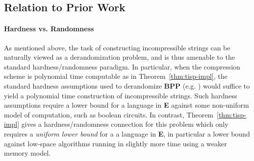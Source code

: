 \documentclass[11pt]{article}
\def\cl{\bf}
\begin{document}
\subsection{Relation to Prior Work}\label{subsec:prior}
\paragraph{Hardness vs. Randomness}
As mentioned above, the task of constructing incompressible strings can be naturally viewed as a derandomization problem, and is thus amenable to the standard hardness/randomness paradigm. In particular, when the compression scheme is polynomial time computable as in Theorem~\ref{thm:tisp-impl}, the standard hardness assumptions used to derandomize {\cl BPP} (e.g. \cite{IW}) would suffice to yield a polynomial time construction of incompressible strings. Such hardness assumptions require a lower bound for a language in {\cl E} against some non-uniform model of computation, such as boolean circuits. In contrast, Theorem~\ref{thm:tisp-impl} gives a hardness/randomness connection for this problem which only requires a \emph{uniform lower bound} for a a language in {\cl E}, in particular a lower bound against low-space algorithms running in slightly more time using a weaker memory model.
\end{document}
